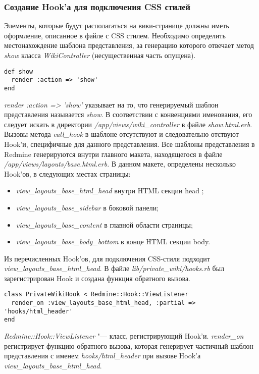 \subsubsection{Создание Hook'а для подключения CSS стилей}
Элементы, которые будут располагаться на вики-странице должны иметь оформление,
описанное в файле с CSS стилем. Необходимо определить местонахождение шаблона
представления, за генерацию которого отвечает метод \textit{show} класса
\textit{WikiController} (несущественная часть опущена).
\small{\begin{lstlisting}
def show
  render :action => 'show'
end
\end{lstlisting}}
\textit{render :action => 'show'} указывает на то, что генерируемый шаблон
представления называется \textit{show}. В соответствии с конвенциями
именования, его следует искать в директории
\textit{/app/views/wiki\_controller} в файле \textit{show.html.erb}.
Вызовы метода \textit{call\_hook} в шаблоне отсутствуют и следовательно
отствуют Hook'и, специфичные для данного представления. Все шаблоны
представления в Redmine генерируются внутри главного макета, находящегося в
файле \textit{/app/views/layouts/base.html.erb}. В данном макете, определены
несколько Hook'ов, в следующих местах страницы:
\begin{itemize}
  \item \textit{view\_layouts\_base\_html\_head} внутри HTML секции head ;
  \item \textit{view\_layouts\_base\_sidebar} в боковой панели;
  \item \textit{view\_layouts\_base\_content} в главной области страницы; 
  \item \textit{view\_layouts\_base\_body\_bottom} в конце HTML секции body.
\end{itemize}
Из перечисленных Hook'ов, для подключения CSS-стиля подходит
\textit{view\_layouts\_base\_html\_head}. В файле \textit{lib/private\_wiki/hooks.rb}
был зарегистрирован Hook и создана функция обратного вызова.
\small{\begin{lstlisting}
class PrivateWikiHook < Redmine::Hook::ViewListener
  render_on :view_layouts_base_html_head, :partial => 'hooks/html_header'
end
\end{lstlisting}}
\textit{Redmine::Hook::ViewListener} "--- класс, регистрирующий Hook'и.
\textit{render\_on} регистрирует функцию обратного вызова, которая генерирует
частичный шаблон представления с именем \textit{hooks/html\_header} при вызове 
Hook'а \textit{view\_layouts\_base\_html\_head}.

